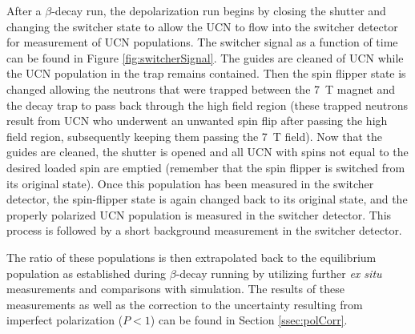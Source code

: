 After a $\beta$-decay run, the depolarization run begins by closing the shutter and changing the switcher
state to allow
the UCN to flow into the switcher detector for measurement of UCN populations. The switcher signal
as a function of time can be found in Figure \ref{fig:switcherSignal}. The guides are cleaned of UCN while
the UCN population in the trap remains contained. Then the spin flipper state is changed allowing the
neutrons that were trapped between the 7~T magnet and the decay trap to pass back through the high
field region (these trapped neutrons result from UCN who underwent an unwanted spin flip after passing
the high field region, subsequently keeping them passing the 7~T field). Now that the guides are cleaned,
the shutter is opened and all UCN with spins not equal to the desired loaded spin are emptied (remember that
the spin flipper is switched from its original state). Once this population has been measured in the
switcher detector, the spin-flipper state is again changed back to its original state, and the
properly polarized UCN population is measured in the switcher detector. This process is followed by a short
background measurement in the switcher detector.

The ratio of these populations is then extrapolated back to the equilibrium population as established
during $\beta$-decay running by utilizing further \textit{ex situ} measurements and comparisons with
simulation. The results of these measurements as well as the correction to the uncertainty resulting
from imperfect polarization ($P<1$) can be found in Section \ref{ssec:polCorr}.





